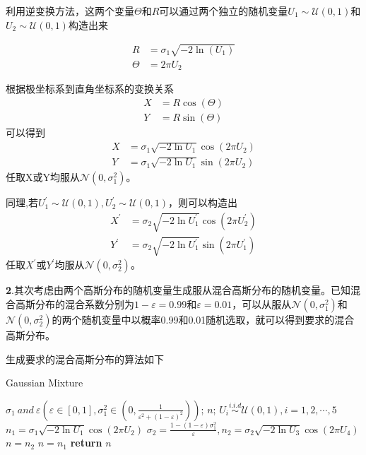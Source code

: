 \documentclass[fontset=windows]{article}
\numberwithin{figure}{section}
\begin{document}
利用逆变换方法，这两个变量\(\Theta\)和\(R\)可以通过两个独立的随机变量\(U_1\sim \mathcal{U}(0,1)\)和\(U_2\sim \mathcal{U}(0,1)\)构造出来

\begin{align*}
    R      & =\sigma_1\sqrt{-2\ln(U_1)} \\
    \Theta & =2\pi U_2
\end{align*}

根据极坐标系到直角坐标系的变换关系
\begin{align*}
    X & =R\cos(\Theta) \\
    Y & =R\sin(\Theta)
\end{align*}
可以得到
\begin{align*}
    X & =\sigma_1\sqrt{-2\ln U_1}\cos(2\pi U_2) \\
    Y & =\sigma_1\sqrt{-2\ln U_1}\sin(2\pi U_2)
\end{align*}
任取X或Y均服从\(\mathcal{N}(0,\sigma^2_1)\)。

同理,若\(U_1^{\prime}\sim \mathcal{U}(0,1),U_2^{\prime}\sim \mathcal{U}(0,1)\)，则可以构造出
\begin{align*}
    X^{\prime} & =\sigma_2\sqrt{-2\ln U_1^{\prime}}\cos(2\pi U_2^{\prime}) \\
    Y^{\prime} & =\sigma_2\sqrt{-2\ln U_1^{\prime}}\sin(2\pi U_1^{\prime})
\end{align*}
任取\(X^{\prime}\)或\(Y^{\prime}\)均服从\(\mathcal{N}(0,\sigma^2_2)\)。

\textbf{2}.其次考虑由两个高斯分布的随机变量生成服从混合高斯分布的随机变量。已知混合高斯分布的混合系数分别为\(1-\varepsilon=0.99\)和\(\varepsilon=0.01\)，可以从服从\(\mathcal{N}(0,\sigma^2_1)\)和\(\mathcal{N}(0,\sigma^2_2)\)的两个随机变量中以概率0.99和0.01随机选取，就可以得到要求的混合高斯分布。

生成要求的混合高斯分布的算法如下
\begin{algorithm}[H]
    \caption{Gaussian Mixture}
    \label{alg:GMM}
    \begin{algorithmic}[1]
        \REQUIRE \(\sigma_1\ and\ \varepsilon(\varepsilon\in [0,1],\sigma^2_1\in (0,\frac{1}{\varepsilon^2+(1-\varepsilon)^2}))\);
        \ENSURE \(n\);
        \STATE \(U_i\overset{i.i.d}{\sim} \mathcal{U}(0,1),i=1,2,\cdots,5\)
        \STATE \(n_1=\sigma_1\sqrt{-2\ln U_1}\cos(2\pi U_2)\)
        \STATE \(\sigma_2=\frac{1-(1-\varepsilon)\sigma^2_1}{\varepsilon},n_2=\sigma_2\sqrt{-2\ln U_3}\cos(2\pi U_4)\)
        \STATE \(n=n_2\)
        \ELSE
        \STATE \(n=n_1\)
        \ENDIF
        \STATE \textbf{return} \(n\)
    \end{algorithmic}
\end{algorithm}
\end{document}

